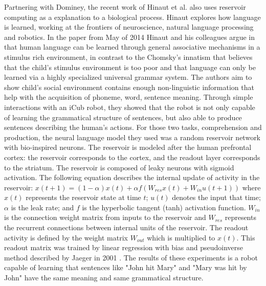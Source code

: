 \documentclass[12pt,oneside]{CUNY_CS_PhD}
\begin{document}
Partnering with Dominey, the recent work of Hinaut et al. \cite{hinaut_2012, hinaut_exploring_2014} also uses reservoir computing as a explanation to a biological process. Hinaut explores how language is learned, working at the frontiers of neuroscience, natural language processing and robotics. In the paper from May of 2014 \cite{hinaut_exploring_2014} Hinaut and his colleagues argue in that human language can be learned through general associative mechanisms in a stimulus rich environment, in contrast to the Chomsky's innatism that believes that the child's stimulus environment is too poor and that language can only be learned via a highly specialized universal grammar system.  The authors aim to show child's social environment contains enough non-linguistic information that help with the acquisition of phoneme, word, sentence meaning. Through simple interactions with an iCub robot, they showed that the robot is not only capable of learning the grammatical structure of sentences, but also able to produce sentences describing the human's actions. For those two tasks, comprehension and production, the neural language model they used was a random reservoir network with bio-inspired neurons. The reservoir is modeled after the human prefrontal cortex: the reservoir corresponds to the cortex, and the readout layer corresponds to the striatum. The reservoir is composed of leaky neurons with sigmoid activation. The following equation describes the internal update of activity in the reservoir:
 $x(t + 1) = (1 − \alpha)x(t) + \alpha f (W_{res}x(t ) + W_{in}u(t + 1))$ where $x(t)$ represents the reservoir state at time $t$; $u(t)$ denotes the input that time;$\alpha$ is the leak rate; and $f$ is the hyperbolic tangent (tanh) activation function. $W_{in}$ is the connection weight matrix from inputs to the reservoir and $W_{res}$ represents the recurrent connections between internal units of the reservoir. The readout activity is defined by the weight matrix $W_{out}$ which is multiplied to $x(t)$. This readout matrix was trained by linear regression with bias and pseudoinverse method described by Jaeger in 2001 \cite{jaeger_echo_2001}. The results of these experiments is a robot capable of learning that sentences like "John hit Mary" and "Mary was hit by John" have the same meaning and same grammatical structure.%
\end{document}
